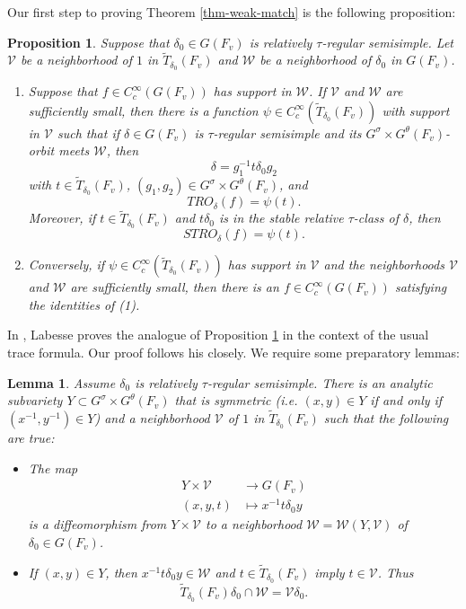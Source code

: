 \documentclass[12pt]{amsart}
\newtheorem{lem}[thm]{Lemma}
\newtheorem{prop}[thm]{Proposition}
\theoremstyle{remark}
\numberwithin{equation}{section}
\newcommand{\lto}{\longrightarrow}
\theoremstyle{definition}
\numberwithin{equation}{subsection}
\begin{document}
Our first step to proving Theorem \ref{thm-weak-match} is the following proposition:

\begin{prop} \label{prop-loc-const} Suppose that $\delta_0 \in G(F_v)$ is relatively $\tau$-regular semisimple.  Let
$\mathcal{V}$ be a neighborhood of $1$ in $\widetilde{T}_{\delta_0}(F_v)$ and
$\mathcal{W}$ be a neighborhood of $\delta_0$ in $G(F_v)$.
\begin{enumerate}
\item Suppose that $f \in C_c^{\infty}(G(F_v))$ has support in $\mathcal{W}$.  If $\mathcal{V}$ and $\mathcal{W}$ are sufficiently small, then
there is a function $\psi \in C_c^{\infty}(\widetilde{T}_{\delta_0}(F_v))$ with support in $\mathcal{V}$ such that if $\delta \in G(F_v)$ is $\tau$-regular semisimple and its $G^{\sigma} \times G^{\theta}(F_v)$-orbit meets $\mathcal{W}$, then
$$
\delta=g^{-1}_1t\delta_0g_2
$$
with $t \in \widetilde{T}_{\delta_0}(F_v)$, $(g_1,g_2) \in G^{\sigma} \times G^{\theta}(F_v)$, and
$$
TRO_{\delta}(f)=\psi(t).
$$
Moreover, if $t \in \widetilde{T}_{\delta_0}(F_v)$ and $t\delta_0$ is in the stable relative $\tau$-class of $\delta$, then
$$
STRO_{\delta}(f)=\psi(t).
$$

\item Conversely, if $\psi \in C_c^{\infty}(\widetilde{T}_{\delta_0}(F_v))$ has support in $\mathcal{V}$ and the
neighborhoods $\mathcal{V}$ and $\mathcal{W}$ are sufficiently small, then there is an
$f \in C_c^{\infty}(G(F_v))$ satisfying the identities of (1).
\end{enumerate}
\end{prop}

\noindent In \cite[\S 3.1]{Lab}, Labesse proves the analogue of Proposition \ref{prop-loc-const} in the context of the usual
trace formula.  Our proof follows his closely.
We require some preparatory lemmas:


\begin{lem} \label{lem-nb1} Assume $\delta_0$ is relatively $\tau$-regular semisimple.
There is an analytic subvariety $Y \subset G^{\sigma} \times G^{\theta}(F_v)$
that is symmetric (i.e. $(x,y) \in Y$ if and only if $(x^{-1},y^{-1}) \in Y$) and a neighborhood $\mathcal{V}$ of $1$ in $\widetilde{T}_{\delta_0}(F_v)$ such that
the following are true:
\begin{itemize}
\item[(i)] The map
\begin{align*}
Y \times \mathcal{V} &\lto G(F_v)\\
(x,y,t)&\longmapsto x^{-1}t\delta_0y
\end{align*}
is a diffeomorphism from $Y \times \mathcal{V}$ to a neighborhood $\mathcal{W}=\mathcal{W}(Y,\mathcal{V})$ of $\delta_0 \in G(F_v)$.
\item[(ii)]
 If $(x,y) \in Y$, then $x^{-1}t\delta_0y \in \mathcal{W}$ and $t \in \widetilde{T}_{\delta_0}(F_v)$ imply $t \in \mathcal{V}$.  Thus
 $$
 \widetilde{T}_{\delta_0}(F_v) \delta_0 \cap \mathcal{W} =\mathcal{V}\delta_0.
 $$
\end{itemize}

\end{lem}
\end{document}
